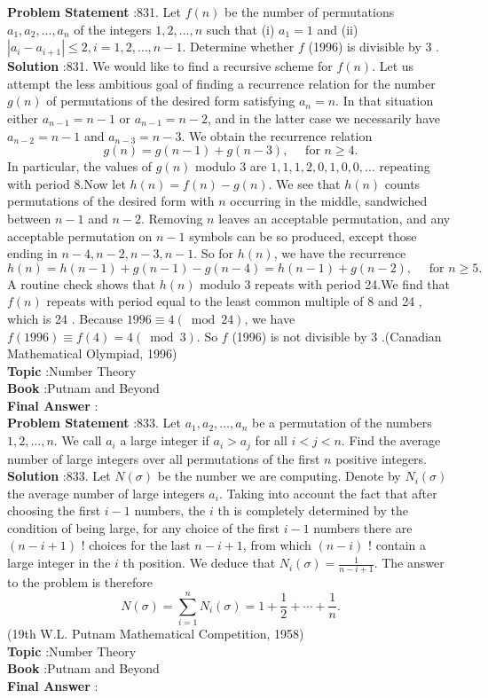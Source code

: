 \documentclass[10pt]{article}
\begin{document}
\textbf{Problem Statement} :831. Let $f(n)$ be the number of permutations $a_{1}, a_{2}, \ldots, a_{n}$ of the integers $1,2, \ldots, n$ such that (i) $a_{1}=1$ and (ii) $\left|a_{i}-a_{i+1}\right| \leq 2, i=1,2, \ldots, n-1$. Determine whether $f$ (1996) is divisible by 3 .\\
\textbf{Solution} :831. We would like to find a recursive scheme for $f(n)$. Let us attempt the less ambitious goal of finding a recurrence relation for the number $g(n)$ of permutations of the desired form satisfying $a_{n}=n$. In that situation either $a_{n-1}=n-1$ or $a_{n-1}=n-2$, and in the latter case we necessarily have $a_{n-2}=n-1$ and $a_{n-3}=n-3$. We obtain the recurrence relation$$ g(n)=g(n-1)+g(n-3), \quad \text { for } n \geq 4 . $$In particular, the values of $g(n)$ modulo 3 are $1,1,1,2,0,1,0,0, \ldots$ repeating with period 8.Now let $h(n)=f(n)-g(n)$. We see that $h(n)$ counts permutations of the desired form with $n$ occurring in the middle, sandwiched between $n-1$ and $n-2$. Removing $n$ leaves an acceptable permutation, and any acceptable permutation on $n-1$ symbols can be so produced, except those ending in $n-4, n-2, n-3, n-1$. So for $h(n)$, we have the recurrence$$ h(n)=h(n-1)+g(n-1)-g(n-4)=h(n-1)+g(n-2), \quad \text { for } n \geq 5 . $$A routine check shows that $h(n)$ modulo 3 repeats with period 24.We find that $f(n)$ repeats with period equal to the least common multiple of 8 and 24 , which is 24 . Because $1996 \equiv 4(\bmod 24)$, we have $f(1996) \equiv f(4)=4(\bmod 3)$. So $f$ (1996) is not divisible by 3 .(Canadian Mathematical Olympiad, 1996)\\
\textbf{Topic} :Number Theory\\
\textbf{Book} :Putnam and Beyond\\
\textbf{Final Answer} :\\


\textbf{Problem Statement} :833. Let $a_{1}, a_{2}, \ldots, a_{n}$ be a permutation of the numbers $1,2, \ldots, n$. We call $a_{i}$ a large integer if $a_{i}>a_{j}$ for all $i<j<n$. Find the average number of large integers over all permutations of the first $n$ positive integers.\\
\textbf{Solution} :833. Let $N(\sigma)$ be the number we are computing. Denote by $N_{i}(\sigma)$ the average number of large integers $a_{i}$. Taking into account the fact that after choosing the first $i-1$ numbers, the $i$ th is completely determined by the condition of being large, for any choice of the first $i-1$ numbers there are $(n-i+1)$ ! choices for the last $n-i+1$, from which $(n-i)$ ! contain a large integer in the $i$ th position. We deduce that $N_{i}(\sigma)=\frac{1}{n-i+1}$. The answer to the problem is therefore$$ N(\sigma)=\sum_{i=1}^{n} N_{i}(\sigma)=1+\frac{1}{2}+\cdots+\frac{1}{n} . $$(19th W.L. Putnam Mathematical Competition, 1958)\\
\textbf{Topic} :Number Theory\\
\textbf{Book} :Putnam and Beyond\\
\textbf{Final Answer} :\\
\end{document}
